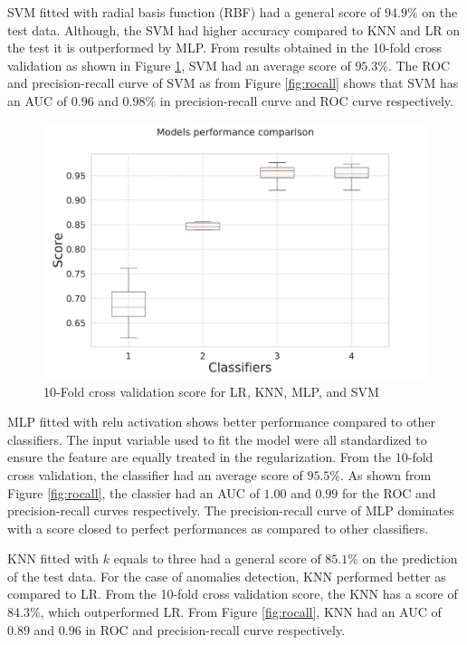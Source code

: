 \documentclass[a4paper,fleqn]{cas-dc}
\begin{document}
SVM  fitted with radial basis function (RBF) had a general score of $94.9\%$ on the test data.  Although, the SVM had higher accuracy compared to KNN and LR on the test it is outperformed by MLP. From results obtained in the 10-fold cross validation as shown in Figure \ref{fig:k-foldcrossvalidation}, SVM had an average score of $95.3\%$. The ROC and precision-recall curve of SVM as from Figure \ref{fig:rocall} shows that SVM has an AUC of $0.96$ and $ 0.98\%$ in precision-recall curve and ROC curve respectively.

\begin{figure}
	\centering
	\includegraphics[width=0.7\linewidth]{Figures/K-fold_cross_validation.pdf}
	\caption{10-Fold cross validation score for LR, KNN, MLP, and SVM}
	\label{fig:k-foldcrossvalidation}
\end{figure}

MLP fitted with relu activation shows better performance compared to other classifiers. The input variable used to fit the model were all standardized to ensure the feature are equally treated in the regularization. From the  10-fold cross validation, the classifier had an average score of $95.5\%$. As shown from Figure \ref{fig:rocall}, the classier had an AUC of $1.00$ and $0.99$ for the ROC and precision-recall curves respectively. The precision-recall curve of MLP dominates with a score closed to perfect performances as compared to other classifiers.  

KNN fitted with $k$ equals to three had a general score of $85.1\%$ on the prediction of the test data. For the case of anomalies detection, KNN performed better as compared to LR. From the 10-fold cross validation score, the KNN has a score of $84.3\%$, which outperformed LR. From Figure \ref{fig:rocall}, KNN had an AUC of $0.89$ and $0.96$ in ROC and precision-recall curve respectively. 
\end{document}

